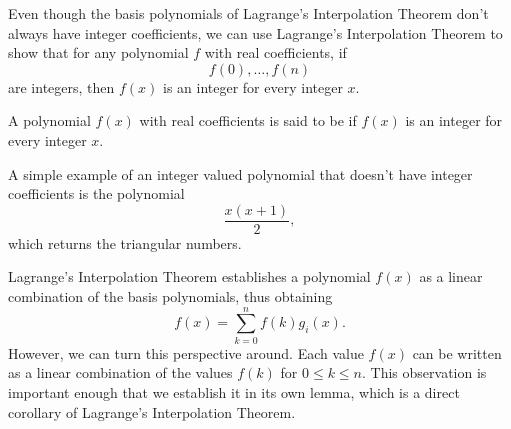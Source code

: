   


Even though the basis polynomials of Lagrange's Interpolation Theorem don't always have integer coefficients, we can use Lagrange's Interpolation Theorem to show that for any polynomial $f$ with real coefficients, if
\begin{equation*}
  f(0),\ldots,f(n)
\end{equation*}
are integers, then $f(x)$ is an integer for every integer $x$.

\begin{definition}
  A polynomial $f(x)$ with real coefficients is said to be 
  if $f(x)$ is an integer for every integer $x$.
\end{definition}

A simple example of an integer valued polynomial that doesn't have integer coefficients is the polynomial
\begin{equation*}
  \frac{x(x+1)}{2},
\end{equation*}
which returns the triangular numbers.

Lagrange's Interpolation Theorem establishes a polynomial $f(x)$ as a linear combination of the basis polynomials, thus obtaining
\begin{equation*}
  f(x)=\sum_{k=0}^n f(k)g_i(x).
\end{equation*}
However, we can turn this perspective around. Each value $f(x)$ can be written as a linear combination of the values $f(k)$ for $0\leq k\leq n$. This observation is important enough that we establish it in its own lemma, which is a direct corollary of Lagrange's Interpolation Theorem.

